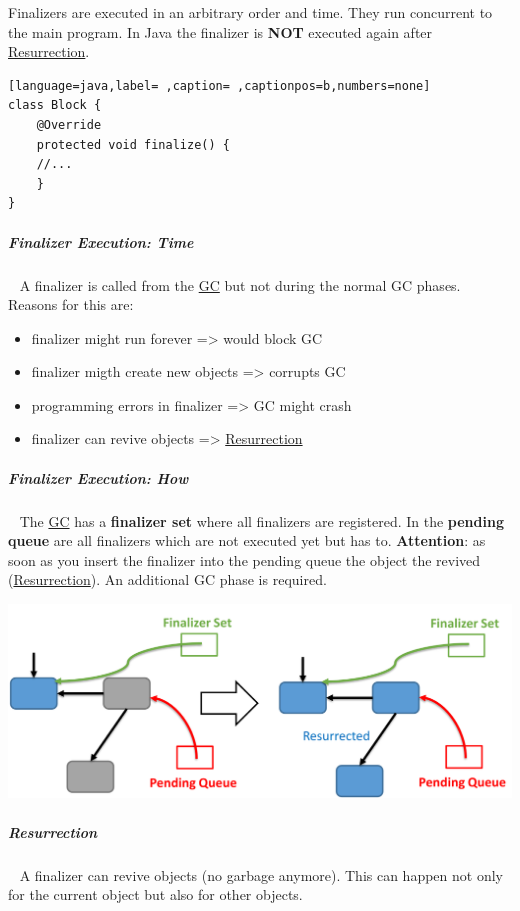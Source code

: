 \documentclass[11pt,twoside,landscape]{article}
\begin{document}
\begin{multicols}{3}
Finalizers are executed in an arbitrary order and time.
They run concurrent to the main program.
In Java the finalizer is \textbf{NOT} executed again after \href{../../../roam/20221231095240-what_is_resurrection.org}{Resurrection}.

\begin{lstlisting}[language=java,label= ,caption= ,captionpos=b,numbers=none]
class Block {
    @Override
    protected void finalize() {
	//...
    }
}
\end{lstlisting}
\subparagraph{Finalizer Execution: Time} \
\label{sec:org62f4b57}
A finalizer is called from the \href{../../../roam/20211008083744-garbage_collection.org}{GC} but not during the normal GC phases. 
Reasons for this are:
\begin{itemize}
\item finalizer might run forever => would block GC
\item finalizer migth create new objects => corrupts GC
\item programming errors in finalizer => GC might crash
\item finalizer can revive objects => \href{../../../roam/20221231095240-what_is_resurrection.org}{Resurrection}
\end{itemize}
\subparagraph{Finalizer Execution: How} \
\label{sec:org8fa97ec}
The \href{../../../roam/20211008083744-garbage_collection.org}{GC} has a \textbf{finalizer set} where all finalizers are registered.
In the \textbf{pending queue} are all finalizers which are not executed yet but has to.
\textbf{Attention}: as soon as you insert the finalizer into the pending queue the object the revived (\href{../../../roam/20221231095240-what_is_resurrection.org}{Resurrection}).
An additional GC phase is required.


{
\begin{center}
\includegraphics[width=.9\linewidth]{img/pending_queue.png}
\end{center}
\captionof{figure}{Pending Queue}\label{fig:pending-queue}
}
\subparagraph{Resurrection} \
\label{sec:org09772f8}
A finalizer can revive objects (no garbage anymore).
This can happen not only for the current object but also for other objects.



\end{multicols}
\end{document}
